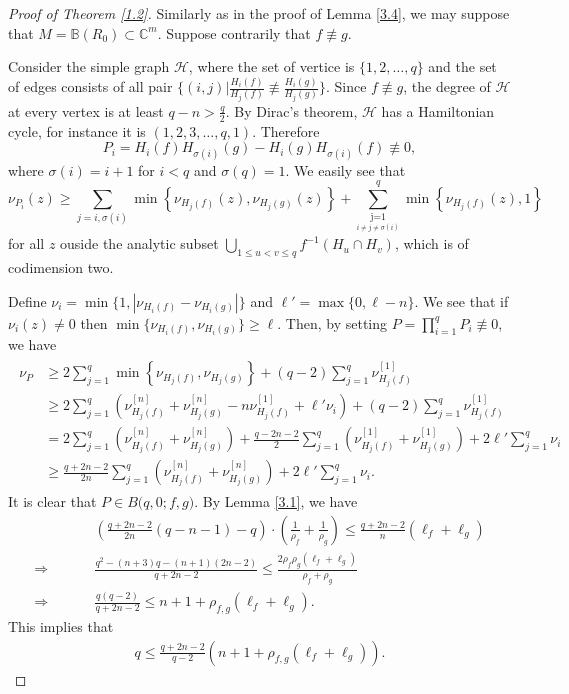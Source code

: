 \documentclass[12pt, a4paper, oneside]{amsart}
\def\underset#1#2{{\mathrel{\mathop {{}_{} {#2}}\limits_{{#1}_{}}}}}
\newcommand{\C}{{\mathbb{C}}}
\newcommand{\B}{\mathbb{B}}
\numberwithin{equation}{section}
\begin{document}
\begin{proof}[Proof of Theorem \ref{1.2}]
Similarly as in the proof of Lemma \ref{3.4}, we may suppose that $M=\B(R_0)\subset \C^m$. Suppose contrarily that $f\not\equiv g$. 

Consider the simple graph $\mathcal H$, where the set of vertice is $\{1,2,\ldots,q\}$ and the set of edges consists of all pair $\{(i,j)|\frac{H_i(f)}{H_j(f)}\not\equiv\frac{H_i(g)}{H_j(g)}\}$. Since $f\not\equiv g$, the degree of $\mathcal H$ at every vertex is at least $q-n>\frac{q}{2}$. By Dirac's theorem, $\mathcal H$ has a Hamiltonian cycle, for instance it is $(1,2,3,\ldots,q,1)$. Therefore 
$$P_{i}=H_{i}(f) H_{\sigma(i)}(g)-H_{i}(g) H_{\sigma(i)}(f)\not\equiv 0,$$
where $\sigma(i)=i+1$ for $i<q$ and $\sigma(q)=1$. We easily see that 
$$\nu_{P_i}(z)\geq \sum_{j=i,\sigma(i)}\min \left\{\nu_{H_j(f)}(z), \nu_{H_j(g)}(z)\right\}+\sum_{\underset{i\ne j\ne \sigma(i)}{j=1}}^{q}\min \left\{\nu_{H_j(f)}(z),1\right\}$$
for all $z$ ouside the analytic subset $\bigcup_{1\le u<v\le q}f^{-1}(H_u\cap H_v)$, which is of codimension two.

Define $\nu_i=\min\{1,|\nu_{H_i(f)}-\nu_{H_i(g)}|\}$ and $\ell'=\max\{0,\ell-n\}$. We see that if $\nu_i(z)\ne 0$ then $\min\{\nu_{H_i(f)},\nu_{H_i(g)}\}\ge \ell$. Then, by setting $P=\prod_{i=1}^{q} P_{i} \not \equiv 0$, we have
\begin{align}\label{new}
\begin{split}
\nu_{P}&\geq 2\sum_{j=1}^{q}\min \left\{\nu_{H_j(f)}, \nu_{H_j(g)}\right\}+(q-2)\sum_{j=1}^{q}\nu^{[1]}_{H_j(f)}\\
&\geq 2\sum_{j=1}^q\left (\nu^{[n]}_{H_j(f)}+\nu^{[n]}_{H_j(g)}-n\nu^{[1]}_{H_j(f)}+\ell'\nu_i\right)+(q-2)\sum_{j=1}^{q}\nu^{[1]}_{H_j(f)}\\
&= 2\sum_{j=1}^q(\nu^{[n]}_{H_j(f)}+\nu^{[n]}_{H_j(g)})+\frac{q-2n-2}{2}\sum_{j=1}^q(\nu^{[1]}_{H_j(f)}+\nu^{[1]}_{H_j(g)})+2\ell'\sum_{j=1}^q\nu_i\\
&\ge \frac{q+2n-2}{2n}\sum_{j=1}^q(\nu^{[n]}_{H_j(f)}+\nu^{[n]}_{H_j(g)})+2\ell'\sum_{j=1}^q\nu_i.
\end{split}
\end{align}
It is clear that $P\in B\big(q,0;f,g)$. By Lemma \ref{3.1}, we have
\begin{align*}
&\left(\frac{q+2n-2}{2n}(q-n-1)-q\right)\cdot\left(\frac{1}{\rho_f}+\frac{1}{\rho_g}\right)\le \frac{q+2n-2}{n}(\ell_f+\ell_g)\\
\Rightarrow\hspace{30pt} &\frac{q^2-(n+3)q-(n+1)(2n-2)}{q+2n-2}\le \frac{2\rho_f\rho_g(\ell_f+\ell_g)}{\rho_f+\rho_g}\\
\Rightarrow\hspace{30pt} &\frac{q(q-2)}{q+2n-2}\le n+1+\rho_{f,g}(\ell_f+\ell_g).
\end{align*}
This implies that
\begin{align}\label{4.4}
q\le \frac{q+2n-2}{q-2}\left(n+1+\rho_{f,g}(\ell_f+\ell_g)\right).
\end{align}



\end{proof}
\end{document}
